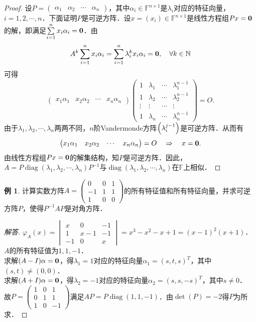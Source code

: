 \documentclass[a4paper,fontset=windows]{ctexbook}
\theoremstyle{definition}
\newtheorem{example}{例}[chapter]
\DeclareMathOperator{\diag}{diag}
\begin{document}
\begin{proof}
设$P=\begin{pmatrix}\alpha_1&\alpha_2&\cdots&\alpha_n\end{pmatrix}$，其中$\alpha_i\in\mathbb{F}^{n\times 1}$是$\lambda_i$对应的特征向量，$i=1,2,\cdots,n$．下面证明$P$是可逆方阵．设$x=(x_i)\in\mathbb{F}^{n\times 1}$是线性方程组$Px={\bf 0}$的解，即满足$\sum\limits_{i=1}^nx_i\alpha_i={\bf 0}$．由
$$A^k\sum_{i=1}^nx_i\alpha_i=\sum_{i=1}^n\lambda_i^kx_i\alpha_i={\bf 0},\quad\forall k\in\mathbb{N}$$
可得
$$\begin{pmatrix}x_1\alpha_1&x_2\alpha_2&\cdots&x_n\alpha_n\end{pmatrix}\begin{pmatrix}1&\lambda_1&\cdots&\lambda_1^{n-1} \\ 1&\lambda_2&\cdots&\lambda_2^{n-1} \\ \vdots&\vdots&\cdots&\vdots \\ 1&\lambda_n&\cdots&\lambda_n^{n-1}\end{pmatrix}=O.$$
由于$\lambda_1,\lambda_2,\cdots,\lambda_n$两两不同，$n$阶Vandermonde方阵$\Bigl(\lambda_i^{j-1}\Bigr)$是可逆方阵．从而有
$$\begin{pmatrix}x_1\alpha_1&x_2\alpha_2&\cdots&x_n\alpha_n\end{pmatrix}=O\quad\Rightarrow\quad x={\bf 0}.$$
由线性方程组$Px={\bf 0}$的解集结构，知$P$是可逆方阵．因此，$A=P\diag(\lambda_1,\lambda_2,\cdots,\lambda_n)P^{-1}$与$\diag(\lambda_1,\lambda_2,\cdots,\lambda_n)$在$\mathbb{F}$上相似．
\end{proof}

\begin{example}\label{ex5.3}
计算实数方阵$A=\begin{pmatrix}0&0&1 \\ -1&1&1 \\ 1&0&0\end{pmatrix}$的所有特征值和所有特征向量，并求可逆方阵$P$，使得$P^{-1}AP$是对角方阵．
\end{example}

\begin{proof}[解答]
$\varphi_A(x)=\begin{vmatrix}x&0&-1 \\ 1&x-1&-1 \\ -1&0&x\end{vmatrix}=x^3-x^2-x+1=(x-1)^2(x+1)$．$A$的所有特征值为$1,1,-1$．\\
求解$(A-I)\alpha={\bf 0}$，得$\lambda_1=1$对应的特征向量$\alpha_1=(s,t,s)^T$，其中$(s,t)\ne(0,0)$．\\
求解$(A+I)\alpha={\bf 0}$，得$\lambda_2=-1$对应的特征向量$\alpha_2=(s,s,-s)^T$，其中$s\ne 0$．\\
故$P=\begin{pmatrix}1&0&1 \\ 0&1&1 \\ 1&0&-1\end{pmatrix}$满足$AP=P\diag(1,1,-1)$．由$\det(P)=-2$得$P$为所求．
\end{proof}
\end{document}
